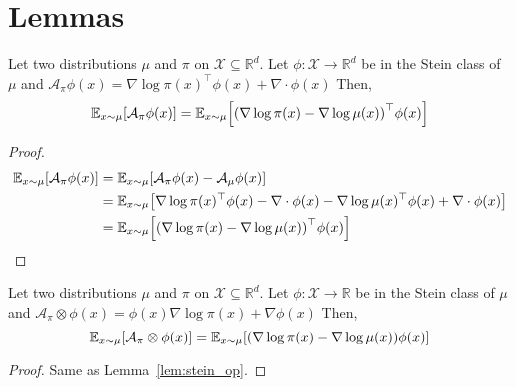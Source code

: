 \documentclass[runningheads,a4paper]{llncs}
\newcommand{\R}{\mathbb{R}}
\newcommand{\E}{\mathbb{E}}
\newcommand{\X}{\mathcal{X}}
\newcommand{\A}{\mathcal{A}}
\DeclarePairedDelimiter{\pare}{(}{)}
\DeclarePairedDelimiter{\sq}{[}{]}
\begin{document}



\appendix
\section{Lemmas}
\begin{lemma}
  Let two distributions $\mu$ and $\pi$ on $\X \subseteq \R^d$.
  Let $\phi: \X \to \R^d$ be in the Stein class of $\mu$ and
  $\A_\pi \phi(x) = \nabla \log \pi(x)^\top \phi(x) + \nabla \cdot \phi(x)$ Then,
  $$
  \E_{x \sim \mu}\sq*{ \A_\pi \phi(x) } =
    \E_{x \sim \mu}\sq*{ \pare*{\nabla \log \pi(x) - \nabla \log \mu(x)}^\top \phi(x) }
  $$
  \begin{proof}
    \begin{align*}
      \E_{x \sim \mu}\sq*{ \A_\pi \phi(x) } &= \E_{x \sim \mu}\sq*{ \A_\pi \phi(x) - \A_\mu \phi(x) } \\
      &= \E_{x \sim \mu}\sq*{ \nabla \log \pi(x)^\top \phi(x) - \nabla \cdot \phi(x) -
      \nabla \log \mu(x)^\top \phi(x) + \nabla \cdot \phi(x) } \\
      &= \E_{x \sim \mu}\sq*{ \pare*{\nabla \log \pi(x) - \nabla \log \mu(x)}^\top \phi(x) }
    \end{align*}
  \end{proof}
  \label{lem:stein_op}
\end{lemma}

\begin{lemma}
  Let two distributions $\mu$ and $\pi$ on $\X \subseteq \R^d$.
  Let $\phi: \X \to \R$ be in the Stein class of $\mu$ and
  $\A_\pi \otimes \phi(x) = \phi(x) \nabla \log \pi(x) + \nabla \phi(x)$ Then,
  $$
  \E_{x \sim \mu}\sq*{ \A_\pi \otimes \phi(x) } =
    \E_{x \sim \mu}\sq*{ \pare*{\nabla \log \pi(x) - \nabla \log \mu(x)} \phi(x) }
  $$
  \begin{proof}
    Same as Lemma~\ref{lem:stein_op}.
  \end{proof}
  \label{lem:stein_op_scalar}
\end{lemma}
\end{document}
